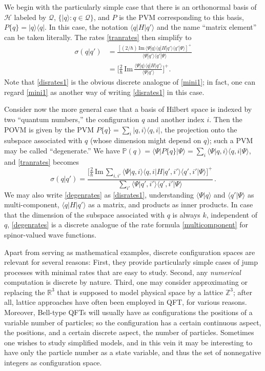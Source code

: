 \documentclass[12pt]{article}
\newcommand{\RRR}{\mathbb{R}} %
\newcommand{\ZZZ}{\mathbb{Z}} %
\newcommand{\1}{\mathbf{1}} %
\renewcommand{\Im}{\mathrm{Im}} %
\newcommand{\Hilbert}{\mathscr{H}}
\renewcommand{\sp}[2]{\langle #1 | #2 \rangle} %
\newcommand{\conf}{\mathcal{Q}} %
\newcommand{\measure}{\mathbb{P}} %
\newcommand{\pov}{{P}}%
\begin{document}
  We begin with the particularly simple case that there is an
orthonormal basis of $\Hilbert$ labeled by $\conf$, $\{ |q\rangle :
q\in\conf \}$, and $\pov$ is the PVM corresponding to this basis,
$\pov\{q\} = |q\rangle \langle q|$. In this case, the notation
$\sp{q}{H|q'}$ and the name ``matrix element'' can be taken
literally. The rates \eqref{tranrates} then simplify to
\begin{subequations}
\begin{align}
   \sigma(q|q') &= \frac{[(2/\hbar) \, \Im \, \sp{\Psi}{q} \sp{q}{H|q'}
   \sp{q'}{\Psi}]^+}{\sp{\Psi}{q'} \sp{q'}{\Psi}} \label{disrates1}\\
   &= \Big[ \frac{2}{\hbar} \, \Im \, \frac{ \sp{\Psi}{q}
   \sp{q}{H|q'}}{\sp{\Psi}{q'}} \Big]^+ .
\end{align}
\end{subequations}
Note that \eqref{disrates1} is the obvious discrete analogue of
\eqref{mini1}; in fact, one can regard \eqref{mini1} as another way
of writing \eqref{disrates1} in this case.

Consider now the more general case that a basis of Hilbert space is
indexed by two ``quantum numbers,'' the configuration $q$ and another
index $i$.  Then the POVM is given by the PVM $\pov\{q\} = \sum_i
|q,i\rangle \langle q,i |$, the projection onto the subspace
associated with $q$ (whose dimension might depend on $q$); such a PVM
may be called ``degenerate.'' We have $\measure(q) =
\sp{\Psi}{\pov\{q\} |\Psi} = \sum\limits_i \sp{\Psi}{q,i}
\sp{q,i}{\Psi}$, and \eqref{tranrates} becomes
\begin{equation}\label{degenrates}
   \sigma(q|q') = \frac{\Big[\frac{2}{\hbar} \, \Im \, \sum\limits_{i,i'}
   \sp{\Psi}{q,i} \sp{q,i}{H|q',i'} \sp{q',i'}{\Psi} \Big]^+}
   {\sum\limits_{i'} \sp{\Psi}{q',i'} \sp{q',i'}{\Psi}} \,.
\end{equation}
We may also write \eqref{degenrates} as \eqref{disrates1},
understanding $\sp{\Psi}{q}$ and $\sp{q'}{\Psi}$ as multi-component,
$\sp{q}{H|q'}$ as a matrix, and products as inner products.  In case
that the dimension of the subspace associated with $q$ is always $k$,
independent of $q$, \eqref{degenrates} is a discrete analogue of the
rate formula \eqref{multicomponent} for spinor-valued wave functions.

Apart from serving as mathematical examples, discrete configuration
spaces are relevant for several reasons: First, they provide
particularly simple cases of jump processes with minimal rates that
are easy to study. Second, any \emph{numerical} computation is discrete 
by
nature. Third, one may consider approximating or replacing the
$\RRR^3$ that is supposed to model physical space by a lattice
$\ZZZ^3$; after all, lattice approaches have often been employed in
QFT, for various reasons. Moreover, Bell-type QFTs will usually have
as configurations the positions of a variable number of particles; so
the configuration has a certain continuous aspect, the positions, and
a certain discrete aspect, the number of particles. Sometimes one
wishes to study simplified models, and in this vein it may be
interesting to have only the particle number as a state variable, and
thus the set of nonnegative integers as configuration space.
\end{document}
